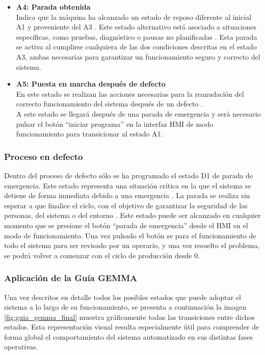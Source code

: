 \begin{itemize}
    \item \textbf{A4: Parada obtenida} \\
    Indica que la máquina ha alcanzado un estado de reposo diferente al inicial A1 y proveniente del A3 \cite{guia_gemma}. Este estado alternativo está asociado a situaciones específicas, como pruebas, diagnóstico o pausas no planificadas \cite{guia_gemma}. Esta parada se activa al cumplirse cualquiera de las dos condiciones descritas en el estado A3, ambas necesarias para garantizar un funcionamiento seguro y correcto del sistema.
    
   \item \textbf{A5: Puesta en marcha después de defecto} \\
   En este estado se realizan las acciones necesarias para la reanudación del correcto funcionamiento del sistema después de un defecto \cite{guia_gemma}. \\
   A este estado se llegará después de una parada de emergencia y será necesario pulsar el botón ``iniciar programa'' en la interfaz HMI de modo funcionamiento para transicionar al estado A1.
\end{itemize}

\subsubsection{Proceso en defecto}

Dentro del proceso de defecto sólo se ha programado el estado D1 de parada de emergencia. Este estado representa una situación crítica en la que el sistema se detiene de forma inmediata debido a una emergencia \cite{guia_gemma}. La parada se realiza sin esperar a que finalice el ciclo, con el objetivo de garantizar la seguridad de las personas, del sistema o del entorno \cite{guia_gemma}. Este estado puede ser alcanzado en cualquier momento que se presione el botón ``parada de emergencia'' desde el HMI en el modo de funcionamiento. Una vez pulsado el botón se para el funcionamiento de todo el sistema para ser revisado por un operario, y una vez resuelto el problema, se podrá volver a comenzar con el ciclo de producción desde 0.

\subsubsection{Aplicación de la Guía GEMMA}

Una vez descritos en detalle todos los posibles estados que puede adoptar el sistema a lo largo de su funcionamiento, se presenta a continuación la imagen \ref{fig:guia_gemma_final} muestra gráficamente todas las transiciones entre dichos estados. Esta representación visual resulta especialmente útil para comprender de forma global el comportamiento del sistema automatizado en sus distintas fases operativas. 

